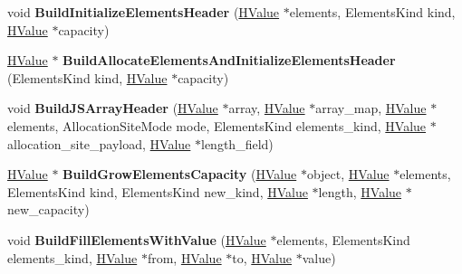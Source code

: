 \begin{DoxyCompactItemize}
\item 
\hypertarget{classv8_1_1internal_1_1_h_graph_builder_af62597c303c06ccfccfd7dbbae0a7af1}{}void {\bfseries Build\+Initialize\+Elements\+Header} (\hyperlink{classv8_1_1internal_1_1_h_value}{H\+Value} $\ast$elements, Elements\+Kind kind, \hyperlink{classv8_1_1internal_1_1_h_value}{H\+Value} $\ast$capacity)\label{classv8_1_1internal_1_1_h_graph_builder_af62597c303c06ccfccfd7dbbae0a7af1}

\item 
\hypertarget{classv8_1_1internal_1_1_h_graph_builder_ad5b91bc11267f5b0537491add49d3bd6}{}\hyperlink{classv8_1_1internal_1_1_h_value}{H\+Value} $\ast$ {\bfseries Build\+Allocate\+Elements\+And\+Initialize\+Elements\+Header} (Elements\+Kind kind, \hyperlink{classv8_1_1internal_1_1_h_value}{H\+Value} $\ast$capacity)\label{classv8_1_1internal_1_1_h_graph_builder_ad5b91bc11267f5b0537491add49d3bd6}

\item 
\hypertarget{classv8_1_1internal_1_1_h_graph_builder_a05ba217495e922f341d1b0e10becb4c5}{}void {\bfseries Build\+J\+S\+Array\+Header} (\hyperlink{classv8_1_1internal_1_1_h_value}{H\+Value} $\ast$array, \hyperlink{classv8_1_1internal_1_1_h_value}{H\+Value} $\ast$array\+\_\+map, \hyperlink{classv8_1_1internal_1_1_h_value}{H\+Value} $\ast$elements, Allocation\+Site\+Mode mode, Elements\+Kind elements\+\_\+kind, \hyperlink{classv8_1_1internal_1_1_h_value}{H\+Value} $\ast$allocation\+\_\+site\+\_\+payload, \hyperlink{classv8_1_1internal_1_1_h_value}{H\+Value} $\ast$length\+\_\+field)\label{classv8_1_1internal_1_1_h_graph_builder_a05ba217495e922f341d1b0e10becb4c5}

\item 
\hypertarget{classv8_1_1internal_1_1_h_graph_builder_ad715d3248b4df93594dfe926d9b4db94}{}\hyperlink{classv8_1_1internal_1_1_h_value}{H\+Value} $\ast$ {\bfseries Build\+Grow\+Elements\+Capacity} (\hyperlink{classv8_1_1internal_1_1_h_value}{H\+Value} $\ast$object, \hyperlink{classv8_1_1internal_1_1_h_value}{H\+Value} $\ast$elements, Elements\+Kind kind, Elements\+Kind new\+\_\+kind, \hyperlink{classv8_1_1internal_1_1_h_value}{H\+Value} $\ast$length, \hyperlink{classv8_1_1internal_1_1_h_value}{H\+Value} $\ast$new\+\_\+capacity)\label{classv8_1_1internal_1_1_h_graph_builder_ad715d3248b4df93594dfe926d9b4db94}

\item 
\hypertarget{classv8_1_1internal_1_1_h_graph_builder_a7136d9aa534d7b8cb7747528bf80a50b}{}void {\bfseries Build\+Fill\+Elements\+With\+Value} (\hyperlink{classv8_1_1internal_1_1_h_value}{H\+Value} $\ast$elements, Elements\+Kind elements\+\_\+kind, \hyperlink{classv8_1_1internal_1_1_h_value}{H\+Value} $\ast$from, \hyperlink{classv8_1_1internal_1_1_h_value}{H\+Value} $\ast$to, \hyperlink{classv8_1_1internal_1_1_h_value}{H\+Value} $\ast$value)\label{classv8_1_1internal_1_1_h_graph_builder_a7136d9aa534d7b8cb7747528bf80a50b}


\end{DoxyCompactItemize}
